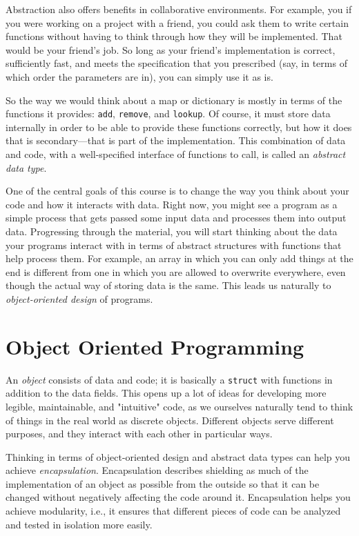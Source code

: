 Abstraction also offers benefits in collaborative environments.
For example, you if you were working on a project with a friend, you could ask them to write certain functions without having to think through how they will be implemented.
That would be your friend's job.
So long as your friend's implementation is correct, sufficiently fast, and meets the specification that you prescribed (say, in terms of which order the parameters are in), you can simply use it as is.

So the way we would think about a map or dictionary is mostly in terms of the functions it provides: \texttt{add}, \texttt{remove}, and \texttt{lookup}.
Of course, it must store data internally in order to be able to provide these functions correctly, but how it does that is secondary---that is part of the implementation.
This combination of data and code, with a well-specified interface of functions to call, is called an \emph{abstract data type}.

One of the central goals of this course is to change the way you think about your code and how it interacts with data.
Right now, you might see a program as a simple process that gets passed some input data and processes them into output data.
Progressing through the material, you will start thinking about the data your programs interact with in terms of abstract structures with functions that help process them.
For example, an array in which you can only add things at the end is different from one in which you are allowed to overwrite everywhere, even though the actual way of storing data is the same.
This leads us naturally to \emph{object-oriented design} of programs. 

\section{Object Oriented Programming}

An \emph{object} consists of data and code; it is basically a \texttt{struct} with functions in addition to the data fields. 
This opens up a lot of ideas for developing more legible, maintainable, and "intuitive" code, as we ourselves naturally tend to think of things in the real world as discrete objects.
Different objects serve different purposes, and they interact with each other in particular ways.

Thinking in terms of object-oriented design and abstract data types can help you achieve \emph{encapsulation}.
Encapsulation describes shielding as much of the implementation of an object as possible from the outside so that it can be changed without negatively affecting the code around it.
Encapsulation helps you achieve modularity, i.e., it ensures that different pieces of code can be analyzed and tested in isolation more easily.

